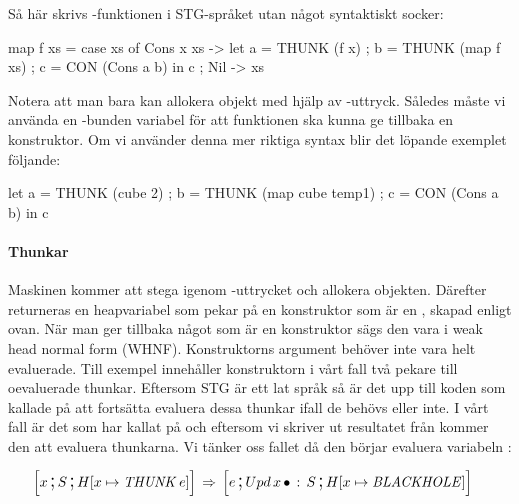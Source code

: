 \documentclass[../Core]{subfiles}
\begin{document}
Så här skrivs -funktionen i STG-språket utan något syntaktiskt socker:

\begin{codeEx}
map f xs = case xs of
    { Cons x xs -> let { a = THUNK (f x)
                       ; b = THUNK (map f xs)
                       ; c = CON (Cons a b)
                       } in c
    ; Nil       -> xs
    }
\end{codeEx}

Notera att man bara kan allokera objekt med hjälp av -uttryck. Således
måste vi använda en -bunden variabel  för att funktionen ska kunna ge tillbaka en konstruktor.
Om vi använder denna mer riktiga syntax blir det löpande exemplet följande:

\begin{codeEx}
let { a = THUNK (cube 2)
    ; b = THUNK (map cube temp1)
    ; c = CON (Cons a b)
    } in c
\end{codeEx}

\paragraph{Thunkar} Maskinen kommer att stega igenom -uttrycket och allokera objekten.
Därefter returneras en heapvariabel som pekar på en konstruktor
som är en , skapad enligt ovan. När man ger tillbaka något som är
en konstruktor sägs den vara i weak head normal form (WHNF). Konstruktorns
argument behöver inte vara helt evaluerade. Till exempel innehåller konstruktorn i vårt fall
två pekare till oevaluerade thunkar. Eftersom STG är ett
lat språk så är det upp till koden som kallade på  att fortsätta
evaluera dessa thunkar ifall de behövs eller inte. I vårt fall är
det  som har kallat på  och eftersom vi skriver ut resultatet från 
kommer den att evaluera thunkarna. Vi tänker oss fallet då den börjar evaluera variabeln :

\begin{align*}
\text{\large$$}\Big[x \,\text{\Large;}\, S \,\text{\Large;}\, & H[x\mapsto\text{\emph{THUNK}}\,e]\Big] \,\Rightarrow\, \text{\large$$}\Big[e \,\text{\Large;}\, Upd\, x\,\bullet \,:\, S \,\text{\Large;}\, H[x\mapsto \text{\emph{BLACKHOLE}}]\Big]
\end{align*}
\end{document}
